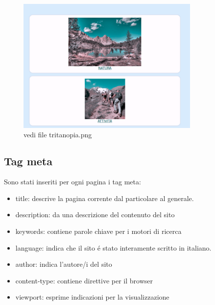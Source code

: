 \documentclass[12pt]{article}
\begin{document}
\begin{itemize}
			\begin{figure}
			\centering
			\includegraphics[width=90mm]{tritanopia1}
			\caption{vedi file tritanopia.png}
			\end{figure}
			
			\end{itemize}	

			
			\newpage
			\subsection{Tag meta}
			
	 Sono stati inseriti per ogni pagina i tag meta:
	 		\begin{itemize}
				\item title: descrive la pagina corrente dal particolare al generale.
				\item description: da una descrizione del contenuto del sito
				\item keywords: contiene parole chiave per i motori di ricerca
				\item language: indica che il sito \'e stato interamente scritto in italiano.
				\item author: indica l'autore/i del sito
				\item content-type: contiene direttive per il browser
				\item viewport: esprime indicazioni per la visualizzazione
			\end{itemize}
\end{document}
